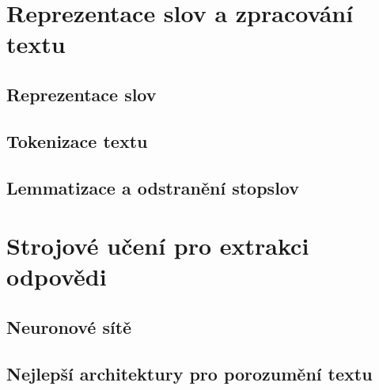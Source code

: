 
\chapter{Reprezentace slov a zpracování textu}
\label{text_processing}

\blindtext[2]\cite{Pravidla}

\section{Reprezentace slov}
\blindtext[4]

\section{Tokenizace textu}
\blindtext[3]

\section{Lemmatizace a odstranění stopslov}
\blindtext[3]




\chapter{Strojové učení pro extrakci odpovědi}
\label{language_comprehension}

\blindtext[2]

\section{Neuronové sítě}
\blindtext[6]

\section{Nejlepší architektury pro porozumění textu}
\blindtext[8]

